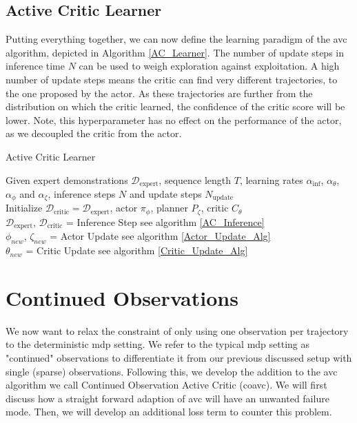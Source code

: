 \subsection{Active Critic Learner}
Putting everything together, we can now define the learning paradigm of the \ac{avc} algorithm, depicted in Algorithm \ref{AC_Learner}. The number of update 
steps in inference time $N$ can be used to weigh exploration against exploitation. A high number of update steps means the critic can find very different 
trajectories, to the one proposed by the actor. As these trajectories are further from the distribution on which the critic learned, the confidence of the 
critic score will be lower. Note, this hyperparameter has no effect on the performance of the actor, as we decoupled the critic from the actor.
\begin{algorithm}
    \caption{Active Critic Learner}
    \label{AC_Learner}
    Given expert demonstrations $\mathcal{D}_{\mathrm{expert}}$, sequence length $T$, learning rates $\alpha_{\mathrm{inf}}$, $\alpha_{\theta}$, 
    $\alpha_{\phi}$ and $\alpha_{\zeta}$, inference steps $N$ and update steps $N_{\mathrm{update}}$\\
     Initialize  $\mathcal{D}_{\mathrm{critic}} = \mathcal{D}_{\mathrm{expert}}$, 
    actor $\pi_{\phi}$, planner $P_{\zeta}$, critic $C_{\theta}$\\
    {
        {
           $\mathcal{D}_{\mathrm{expert}}$, $\mathcal{D}_{\mathrm{critic}}$ = Inference Step \hfill{see algorithm \ref{AC_Inference}}\\
        }
        {
            $\phi_{new}$, $\zeta_{new}$ = Actor Update \hfill{see algorithm \ref{Actor_Update_Alg}}\\
            $\theta_{new}$ = Critic Update \hfill{see algorithm \ref{Critic_Update_Alg}}\\
        }
    }
\end{algorithm}

\section{Continued Observations}
\label{sec:relax_dense}
We now want to relax the constraint of only using one observation per trajectory to the deterministic \ac{mdp} setting. 
We refer to the typical \ac{mdp} setting as "continued" observations to differentiate it from our previous discussed setup with single (sparse) observations. 
Following this, we develop the addition to the \ac{avc} algorithm we call Continued Observation Active Critic (\ac{coavc}). 
We will first discuss how a straight forward adaption of \ac{avc} will have an unwanted failure mode. Then, we will develop an additional loss term to counter this problem.\\

